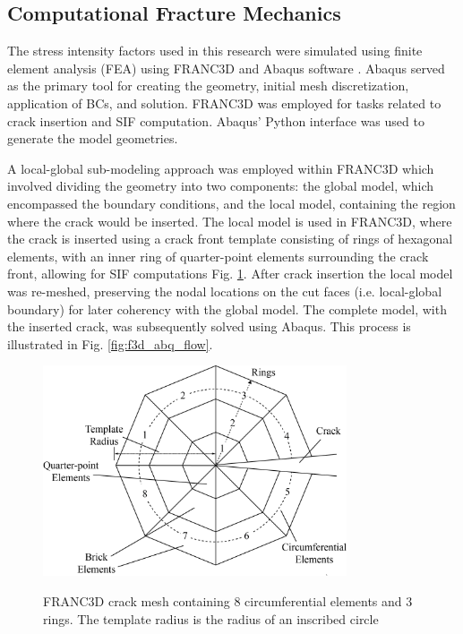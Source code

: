 \subsection{Computational Fracture Mechanics}

The stress intensity factors used in this research were simulated using finite element analysis (FEA) using FRANC3D and Abaqus software \cite{f3d, Abaqus}. Abaqus served as the primary tool for creating the geometry, initial mesh discretization, application of BCs, and solution. FRANC3D was employed for tasks related to crack insertion and SIF computation. Abaqus' Python interface was used to generate the model geometries.

A local-global sub-modeling approach was employed within FRANC3D which involved dividing the geometry into two components: the global model, which encompassed the boundary conditions, and the local model, containing the region where the crack would be inserted. The local model is used in FRANC3D, where the crack is inserted using a crack front template consisting of rings of hexagonal elements, with an inner ring of quarter-point elements surrounding the crack front, allowing for SIF computations Fig. \ref{fig:f3d_mesh}. After crack insertion the local model was re-meshed, preserving the nodal locations on the cut faces (i.e. local-global boundary) for later coherency with the global model. The complete model, with the inserted crack, was subsequently solved using Abaqus. This process is illustrated in Fig. \ref{fig:f3d_abq_flow}.



\begin{figure}
  \centering
  \includegraphics[width=0.8\textwidth]{geometry_figures/f3d_crack.png}
  \label{fig:f3d_mesh}
  \caption{FRANC3D crack mesh containing 8 circumferential elements and 3 rings. The template radius is the radius of an inscribed circle}
\end{figure}

